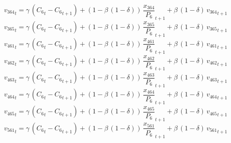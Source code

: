 \begin{dmath}
{{v_{364}}}_{t}={{\gamma}}\, \left({{C_{6}}}_{t}-{{C_{6}}}_{t+1}\right)+\left(1-{{\beta}}\, \left(1-{{\delta}}\right)\right)\, {{\frac{x_{364}}{P_{6}}}}_{t+1}+{{\beta}}\, \left(1-{{\delta}}\right)\, {{v_{364}}}_{t+1}
\end{dmath}
\begin{dmath}
{{v_{365}}}_{t}={{\gamma}}\, \left({{C_{6}}}_{t}-{{C_{6}}}_{t+1}\right)+\left(1-{{\beta}}\, \left(1-{{\delta}}\right)\right)\, {{\frac{x_{365}}{P_{6}}}}_{t+1}+{{\beta}}\, \left(1-{{\delta}}\right)\, {{v_{365}}}_{t+1}
\end{dmath}
\begin{dmath}
{{v_{461}}}_{t}={{\gamma}}\, \left({{C_{6}}}_{t}-{{C_{6}}}_{t+1}\right)+\left(1-{{\beta}}\, \left(1-{{\delta}}\right)\right)\, {{\frac{x_{461}}{P_{6}}}}_{t+1}+{{\beta}}\, \left(1-{{\delta}}\right)\, {{v_{461}}}_{t+1}
\end{dmath}
\begin{dmath}
{{v_{462}}}_{t}={{\gamma}}\, \left({{C_{6}}}_{t}-{{C_{6}}}_{t+1}\right)+\left(1-{{\beta}}\, \left(1-{{\delta}}\right)\right)\, {{\frac{x_{462}}{P_{6}}}}_{t+1}+{{\beta}}\, \left(1-{{\delta}}\right)\, {{v_{462}}}_{t+1}
\end{dmath}
\begin{dmath}
{{v_{463}}}_{t}={{\gamma}}\, \left({{C_{6}}}_{t}-{{C_{6}}}_{t+1}\right)+\left(1-{{\beta}}\, \left(1-{{\delta}}\right)\right)\, {{\frac{x_{463}}{P_{6}}}}_{t+1}+{{\beta}}\, \left(1-{{\delta}}\right)\, {{v_{463}}}_{t+1}
\end{dmath}
\begin{dmath}
{{v_{464}}}_{t}={{\gamma}}\, \left({{C_{6}}}_{t}-{{C_{6}}}_{t+1}\right)+\left(1-{{\beta}}\, \left(1-{{\delta}}\right)\right)\, {{\frac{x_{464}}{P_{6}}}}_{t+1}+{{\beta}}\, \left(1-{{\delta}}\right)\, {{v_{464}}}_{t+1}
\end{dmath}
\begin{dmath}
{{v_{465}}}_{t}={{\gamma}}\, \left({{C_{6}}}_{t}-{{C_{6}}}_{t+1}\right)+\left(1-{{\beta}}\, \left(1-{{\delta}}\right)\right)\, {{\frac{x_{465}}{P_{6}}}}_{t+1}+{{\beta}}\, \left(1-{{\delta}}\right)\, {{v_{465}}}_{t+1}
\end{dmath}
\begin{dmath}
{{v_{561}}}_{t}={{\gamma}}\, \left({{C_{6}}}_{t}-{{C_{6}}}_{t+1}\right)+\left(1-{{\beta}}\, \left(1-{{\delta}}\right)\right)\, {{\frac{x_{561}}{P_{6}}}}_{t+1}+{{\beta}}\, \left(1-{{\delta}}\right)\, {{v_{561}}}_{t+1}
\end{dmath}
